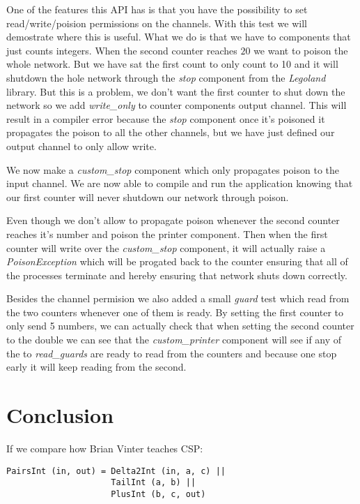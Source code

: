 \documentclass[a4paper,12pt]{article}
\begin{document}
One of the features this API has is that you have the possibility to set 
read/write/poision permissions on the channels. With this test we will
demostrate where this is useful. What we do is that we have to components
that just counts integers. When the second counter reaches $20$ we want
to poison the whole network. But we have sat the first count to only count
to 10 and it will shutdown the hole network through the {\it stop}
component from the {\it Legoland} library. But this is a problem, we don't
want the first counter to shut down the network so we add {\it write\_only}
to counter components output channel. This will result in a compiler error
because the {\it stop} component once it's poisoned it propagates the poison
to all the other channels, but we have just defined our output channel to
only allow write.

We now make a {\it custom\_stop} component which only propagates poison to
the input channel. We are now able to compile and run the application knowing
that our first counter will never shutdown our network through poison.

Even though we don't allow to propagate poison whenever the second counter
reaches it's number and poison the printer component. Then when the first
counter will write over the {\it custom\_stop} component, it will actually
raise a {\it PoisonException} which will be progated back to the counter
ensuring that all of the processes terminate and hereby ensuring that network
shuts down correctly.

Besides the channel permision we also added a small {\it guard} test which read
from the two counters whenever one of them is ready. By setting the first
counter to only send 5 numbers, we can actually check that when setting the
second counter to the double we can see that the {\it custom\_printer} component
will see if any of the to {\it read\_guards} are ready to read from the counters
and because one stop early it will keep reading from the second.


\section{Conclusion}
\label{conclusion}

If we compare how Brian Vinter teaches CSP\cite{vintercsp}:
\begin{center}
\begin{verbatim}
PairsInt (in, out) = Delta2Int (in, a, c) || 
                     TailInt (a, b) || 
                     PlusInt (b, c, out) 
\end{verbatim}
\end{center}
\end{document}

